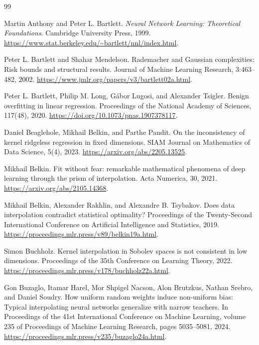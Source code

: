 \documentclass[11pt,twoside]{article}
\theoremstyle{definition}
\theoremstyle{remark}
\begin{document}
\setlength{\bibsep}{3pt}
\begin{thebibliography}{99}

Martin Anthony and Peter L. Bartlett.
\newblock \emph{Neural Network Learning: Theoretical Foundations}.
\newblock Cambridge University Press, 1999.
\newblock \url{https://www.stat.berkeley.edu/~bartlett/nnl/index.html}.

Peter L. Bartlett and Shahar Mendelson.
\newblock Rademacher and Gaussian complexities: Risk bounds and structural
results.
\newblock Journal of Machine Learning Research, 3:463--482, 2002.
\newblock \url{https://www.jmlr.org/papers/v3/bartlett02a.html}.

Peter L. Bartlett, Philip M. Long, G\'abor Lugosi, and Alexander Tsigler.
\newblock Benign overfitting in linear regression.
\newblock Proceedings of the National Academy of Sciences, 117(48), 2020.
\newblock \url{https://doi.org/10.1073/pnas.1907378117}.

Daniel Beaglehole, Mikhail Belkin, and Parthe Pandit.
\newblock On the inconsistency of kernel ridgeless regression in fixed
dimensions.
\newblock SIAM Journal on Mathematics of Data Science, 5(4), 2023.
\newblock \url{https://arxiv.org/abs/2205.13525}.

Mikhail Belkin.
\newblock Fit without fear: remarkable mathematical phenomena of deep
learning through the prism of interpolation.
\newblock Acta Numerica, 30, 2021.
\newblock \url{https://arxiv.org/abs/2105.14368}.

Mikhail Belkin, Alexander Rakhlin, and Alexandre B. Tsybakov.
\newblock Does data interpolation contradict statistical optimality?
\newblock Proceedings of the Twenty-Second International Conference on
Artificial Intelligence and Statistics, 2019.
\newblock \url{https://proceedings.mlr.press/v89/belkin19a.html}.

Simon Buchholz.
\newblock Kernel interpolation in Sobolev spaces is not consistent in low
dimensions.
\newblock Proceedings of the 35th Conference on Learning Theory, 2022.
\newblock \url{https://proceedings.mlr.press/v178/buchholz22a.html}.

Gon Buzaglo, Itamar Harel, Mor Shpigel Nacson, Alon Brutzkus, Nathan Srebro,
and Daniel Soudry.
\newblock How uniform random weights induce non-uniform bias: Typical
interpolating neural networks generalize with narrow teachers.
\newblock In Proceedings of the 41st International Conference on Machine
Learning, volume 235 of Proceedings of Machine Learning Research,
pages 5035--5081, 2024.
\newblock \url{https://proceedings.mlr.press/v235/buzaglo24a.html}.


\end{thebibliography}
\end{document}
